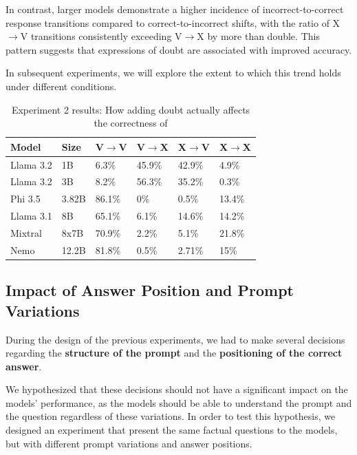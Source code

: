 In contrast, larger models demonstrate a higher incidence of incorrect-to-correct response transitions compared to correct-to-incorrect shifts, with the ratio of X$\rightarrow$V transitions consistently exceeding V$\rightarrow$X by more than double. This pattern suggests that expressions of doubt are associated with improved accuracy.

In subsequent experiments, we will explore the extent to which this trend holds under different conditions.

\begin{table}[ht]
  \centering
  \small %
  \begin{tabular}{|l|l|l|l|l|l|}
    \hline
    \textbf{Model} & \textbf{Size} & \textbf{V$\rightarrow$V} & \textbf{V$\rightarrow$X} & \textbf{X$\rightarrow$V} & \textbf{X$\rightarrow$X} \\
    \hline
    Llama 3.2 & 1B  & 6.3\% & 45.9\% & 42.9\% & 4.9\%\\
    Llama 3.2 & 3B & 8.2\% & 56.3\% & 35.2\% & 0.3\%\\
    Phi 3.5 & 3.82B & 86.1\% & 0\% & 0.5\% & 13.4\%\\
    Llama 3.1 & 8B & 65.1\% & 6.1\% & 14.6\% & 14.2\% \\
    Mixtral & 8x7B &70.9\% & 2.2\% & 5.1\% & 21.8\% \\
    Nemo & 12.2B & 81.8\% & 0.5\% & 2.71\% & 15\%\\
    \hline
  \end{tabular}
  \caption{Experiment 2 results: How adding doubt actually affects the correctness of}
  \label{tab:accuracy_deep_dive}
\end{table}

\subsection{Impact of Answer Position and Prompt Variations}

During the design of the previous experiments, we had to make several decisions regarding the \textbf{structure of the prompt} and the \textbf{positioning of the correct answer}.

We hypothesized that these decisions should not have a significant impact on the models' performance, as the models should be able to understand the prompt and the question regardless of these variations. In order to test this hypothesis, we designed an experiment that present the same factual questions to the models, but with different prompt variations and answer positions.

